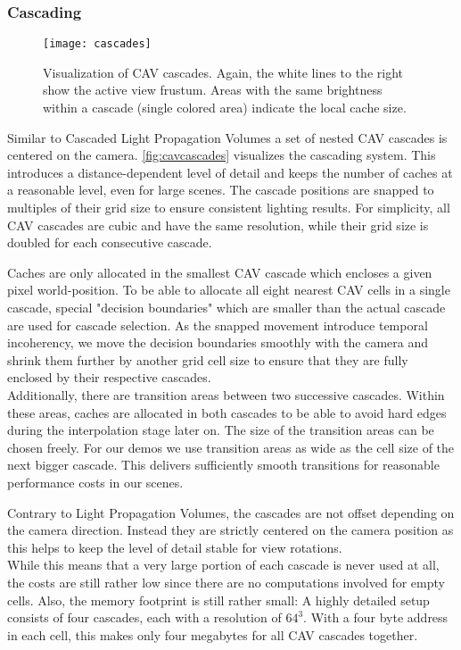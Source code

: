 \documentclass[thesis.tex]{subfiles}
\begin{document}
\subsubsection{Cascading} \label{sec:impl:cavcascading}
\begin{figure}[h]
	\centering
	\texttt{[image: cascades]}
	\caption{Visualization of CAV cascades. Again, the white lines to the right show the active view frustum.
	Areas with the same brightness within a cascade (single colored area) indicate the local cache size.
	} \label{fig:cavcascades}
\end{figure}
Similar to Cascaded Light Propagation Volumes \cite{bib:lpt} a set of nested CAV cascades is centered on the camera.
\autoref{fig:cavcascades} visualizes the cascading system.
This introduces a distance-dependent level of detail and keeps the number of caches at a reasonable level, even for large scenes.
The cascade positions are snapped to multiples of their grid size to ensure consistent lighting results. %
For simplicity, all CAV cascades are cubic and have the same resolution, while their grid size is doubled for each consecutive cascade.

Caches are only allocated in the smallest CAV cascade which encloses a given pixel world-position.
To be able to allocate all eight nearest CAV cells in a single cascade, special "decision boundaries" which are smaller than the actual cascade are used for cascade selection.
As the snapped movement introduce temporal incoherency, we move the decision boundaries smoothly with the camera and shrink them further by another grid cell size to ensure that they are fully enclosed by their respective cascades.
\\
Additionally, there are transition areas between two successive cascades.
Within these areas, caches are allocated in both cascades to be able to avoid hard edges during the interpolation stage later on.
The size of the transition areas can be chosen freely.
For our demos we use transition areas as wide as the cell size of the next bigger cascade. %
This delivers sufficiently smooth transitions for reasonable performance costs in our scenes.

Contrary to Light Propagation Volumes, the cascades are not offset depending on the camera direction.
Instead they are strictly centered on the camera position as this helps to keep the level of detail stable for view rotations.\\
While this means that a very large portion of each cascade is never used at all, the costs are still rather low since there are no computations involved for empty cells.
Also, the memory footprint is still rather small: %
A highly detailed setup consists of four cascades, each with a resolution of $64^3$.
With a four byte address in each cell, this makes only four megabytes for all CAV cascades together.
\end{document}
